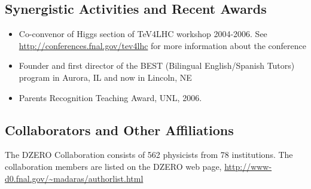 \documentclass[11pt]{article}
\begin{document}





\subsection*{Synergistic Activities and Recent Awards}
\begin{itemize}
\item Co-convenor of Higgs section of TeV4LHC workshop 2004-2006.  See
  \url{http://conferences.fnal.gov/tev4lhc} for more information
  about the conference
\item Founder and first director of the BEST (Bilingual
  English/Spanish Tutors) program in Aurora, IL and now in Lincoln, NE
\item Parents Recognition Teaching Award, UNL, 2006.
\end{itemize}

\subsection*{Collaborators and Other Affiliations}
The DZERO Collaboration consists of 562 physicists from 78 institutions.
The collaboration members are listed on the DZERO web page,
\url{http://www-d0.fnal.gov/~madaras/authorlist.html}
\end{document}
